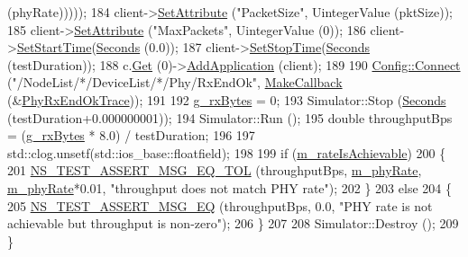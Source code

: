 \begin{DoxyCode}
       (phyRate)))));
184   client->\hyperlink{classns3_1_1ObjectBase_ac60245d3ea4123bbc9b1d391f1f6592f}{SetAttribute} (\textcolor{stringliteral}{"PacketSize"}, UintegerValue (pktSize));
185   client->\hyperlink{classns3_1_1ObjectBase_ac60245d3ea4123bbc9b1d391f1f6592f}{SetAttribute} (\textcolor{stringliteral}{"MaxPackets"}, UintegerValue (0));
186   client->\hyperlink{classns3_1_1Application_a8360a49748e30c52ffdcc7a305c3cd48}{SetStartTime}(\hyperlink{group__timecivil_ga33c34b816f8ff6628e33d5c8e9713b9e}{Seconds} (0.0));
187   client->\hyperlink{classns3_1_1Application_a732c1fdadf0be176c753a2ce6e27dff9}{SetStopTime}(\hyperlink{group__timecivil_ga33c34b816f8ff6628e33d5c8e9713b9e}{Seconds} (testDuration));
188   c.\hyperlink{classns3_1_1NodeContainer_a9ed96e2ecc22e0f5a3d4842eb9bf90bf}{Get} (0)->\hyperlink{classns3_1_1Node_ab98b4fdc4aadc86366b80e8a79a53f47}{AddApplication} (client);
189 
190   \hyperlink{group__config_ga4014f151241cd0939b6cb64409605736}{Config::Connect} (\textcolor{stringliteral}{"/NodeList/*/DeviceList/*/Phy/RxEndOk"}, 
      \hyperlink{group__makecallbackmemptr_ga9376283685aa99d204048d6a4b7610a4}{MakeCallback} (&\hyperlink{spectrum-ideal-phy-test_8cc_abe11a97645f01a1213944fb2cbabeb1a}{PhyRxEndOkTrace}));
191 
192   \hyperlink{spectrum-ideal-phy-test_8cc_af09b60ca0cfec21bd5d0aff8f44eb19c}{g\_rxBytes} = 0;
193   Simulator::Stop (\hyperlink{group__timecivil_ga33c34b816f8ff6628e33d5c8e9713b9e}{Seconds} (testDuration+0.000000001));
194   Simulator::Run ();
195   \textcolor{keywordtype}{double} throughputBps = (\hyperlink{spectrum-ideal-phy-test_8cc_af09b60ca0cfec21bd5d0aff8f44eb19c}{g\_rxBytes} * 8.0) / testDuration;
196 
197   std::clog.unsetf(std::ios\_base::floatfield);
198   
199   \textcolor{keywordflow}{if} (\hyperlink{classSpectrumIdealPhyTestCase_a613895127f75c079ee1fdaccbe62b547}{m\_rateIsAchievable})
200     \{
201       \hyperlink{group__testing_ga9e7861b56b4e70db3b56044cb7a28e41}{NS\_TEST\_ASSERT\_MSG\_EQ\_TOL} (throughputBps, 
      \hyperlink{classSpectrumIdealPhyTestCase_a9cfb76527300fd830e2b43ad70c580d6}{m\_phyRate}, \hyperlink{classSpectrumIdealPhyTestCase_a9cfb76527300fd830e2b43ad70c580d6}{m\_phyRate}*0.01, \textcolor{stringliteral}{"throughput does not match PHY rate"});
202     \}
203   \textcolor{keywordflow}{else}
204     \{
205       \hyperlink{group__testing_ga2a9d78cffb3db8e867c35fff0b698cf5}{NS\_TEST\_ASSERT\_MSG\_EQ} (throughputBps, 0.0, \textcolor{stringliteral}{"PHY rate is not achievable but
       throughput is non-zero"});    
206     \}
207 
208   Simulator::Destroy ();
209 \}
\end{DoxyCode}


